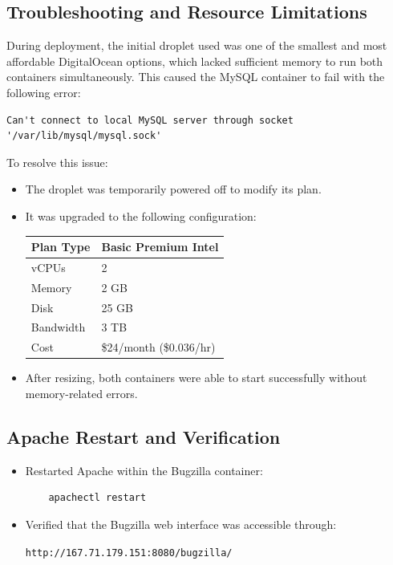 \subsection{Troubleshooting and Resource Limitations}
During deployment, the initial droplet used was one of the smallest and most affordable DigitalOcean options, which lacked sufficient memory to run both containers simultaneously. This caused the MySQL container to fail with the following error:
\begin{verbatim}
Can't connect to local MySQL server through socket '/var/lib/mysql/mysql.sock'
\end{verbatim}

\noindent
To resolve this issue:
\begin{itemize}
    \item The droplet was temporarily powered off to modify its plan.
    \item It was upgraded to the following configuration:
    \begin{center}
        \begin{tabular}{|l|l|}
        \hline
        Plan Type & Basic Premium Intel \\
        \hline
        vCPUs & 2 \\
        \hline
        Memory & 2 GB \\
        \hline
        Disk & 25 GB \\
        \hline
        Bandwidth & 3 TB \\
        \hline
        Cost & \$24/month (\$0.036/hr) \\
        \hline
        \end{tabular}
    \end{center}
    \item After resizing, both containers were able to start successfully without memory-related errors.
\end{itemize}

\subsection{Apache Restart and Verification}
\begin{itemize}
    \item Restarted Apache within the Bugzilla container:
    \begin{verbatim}
    apachectl restart
    \end{verbatim}
    \item Verified that the Bugzilla web interface was accessible through:
    \begin{center}
    \texttt{http://167.71.179.151:8080/bugzilla/}
    \end{center}
\end{itemize}

